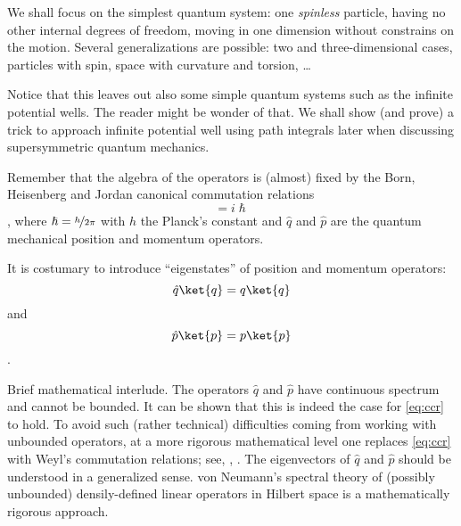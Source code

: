 We shall focus on  the simplest quantum system: one
\emph{spinless} particle, having no other internal
degrees of freedom, moving in one dimension without constrains on the motion.
Several generalizations are possible: two and three-dimensional cases,
particles with spin, space with curvature and torsion, \ldots
\begin{approfondimento}
   Notice that this leaves out also some simple quantum systems such as the
   infinite potential wells. The reader might be wonder of that.
   We shall show (and prove) a trick to approach infinite potential well using path
   integrals later when discussing supersymmetric quantum mechanics.
\end{approfondimento}
Remember that the algebra of the
operators is (almost) fixed by  the Born, Heisenberg and Jordan canonical commutation relations
\begin{dmath}[label={ccr}]
[\hat{q}, \hat{p} ] = i\hslash 
\end{dmath},
where $\hslash = \nicefrac{h}{2\pi}$ with $h$ the Planck's constant and
$\hat{q}$ and $\hat{p}$ are the quantum mechanical position and momentum
operators.

It is costumary to introduce ``eigenstates'' of position and momentum operators:
\begin{dmath*}
   \hat{q} \ket{q} = q \ket{q} 
\end{dmath*}
and
\begin{dmath*}
   \hat{p} \ket{p} = p \ket{p} 
\end{dmath*}.
\begin{approfondimento}
   Brief mathematical interlude.
   The operators $\hat{q}$ and
$\hat{p}$ have continuous spectrum and cannot be bounded. It can be shown that
this is indeed the case for 
\cref{eq:ccr} to hold.
To avoid such (rather technical)
difficulties coming from working with unbounded operators, at a more rigorous
mathematical 
level one replaces \cref{eq:ccr} with
Weyl's commutation relations; see, \eg, \textcite{Zeidler:2009c}.
The eigenvectors of $\hat{q}$ and $\hat{p}$ should be understood in a
generalized sense. 
von Neumann's spectral theory of (possibly unbounded) densily-defined linear
operators in Hilbert space is a mathematically rigorous approach.
\end{approfondimento}


